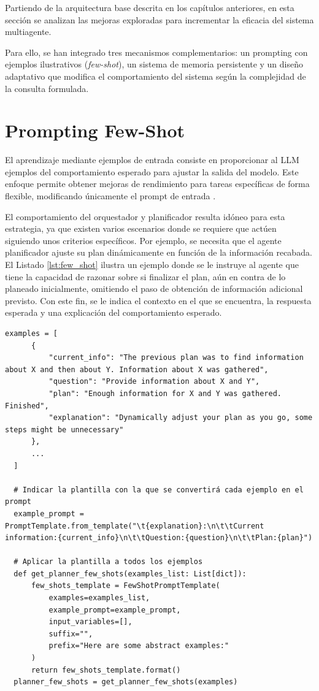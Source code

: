 Partiendo de la arquitectura base descrita en los capítulos anteriores, en esta sección se analizan las mejoras exploradas para incrementar la eficacia del sistema multiagente.

Para ello, se han integrado tres mecanismos complementarios: un prompting con ejemplos ilustrativos (\textit{few-shot}), un sistema de memoria persistente y un diseño adaptativo que modifica el comportamiento del sistema según la complejidad de la consulta formulada.

\section{Prompting Few-Shot}
El aprendizaje mediante ejemplos de entrada consiste en proporcionar al LLM ejemplos del comportamiento esperado para ajustar la salida del modelo. Este enfoque permite obtener mejoras de rendimiento para tareas específicas de forma flexible, modificando únicamente el prompt de entrada \cite{brown_language_2020}.

El comportamiento del orquestador y planificador resulta idóneo para esta estrategia, ya que existen varios escenarios donde se requiere que actúen siguiendo unos criterios específicos. Por ejemplo, se necesita que el agente planificador ajuste su plan dinámicamente en función de la información recabada. El Listado \ref{lst:few_shot} ilustra un ejemplo donde se le instruye al agente que tiene la capacidad de razonar sobre si finalizar el plan, aún en contra de lo planeado inicialmente, omitiendo el paso de obtención de información adicional previsto. Con este fin, se le indica el contexto en el que se encuentra, la respuesta esperada y una explicación del comportamiento esperado.

\begin{lstlisting}[caption={Integración de ejemplos few-shot al agente planificador},label={lst:few_shot}]
  examples = [
      {
          "current_info": "The previous plan was to find information about X and then about Y. Information about X was gathered",
          "question": "Provide information about X and Y",
          "plan": "Enough information for X and Y was gathered. Finished",
          "explanation": "Dynamically adjust your plan as you go, some steps might be unnecessary"
      },
      ...
  ]

  # Indicar la plantilla con la que se convertirá cada ejemplo en el prompt
  example_prompt = PromptTemplate.from_template("\t{explanation}:\n\t\tCurrent information:{current_info}\n\t\tQuestion:{question}\n\t\tPlan:{plan}")

  # Aplicar la plantilla a todos los ejemplos
  def get_planner_few_shots(examples_list: List[dict]):
      few_shots_template = FewShotPromptTemplate(
          examples=examples_list,
          example_prompt=example_prompt,
          input_variables=[],
          suffix="",
          prefix="Here are some abstract examples:"
      )
      return few_shots_template.format()
  planner_few_shots = get_planner_few_shots(examples)
\end{lstlisting}


